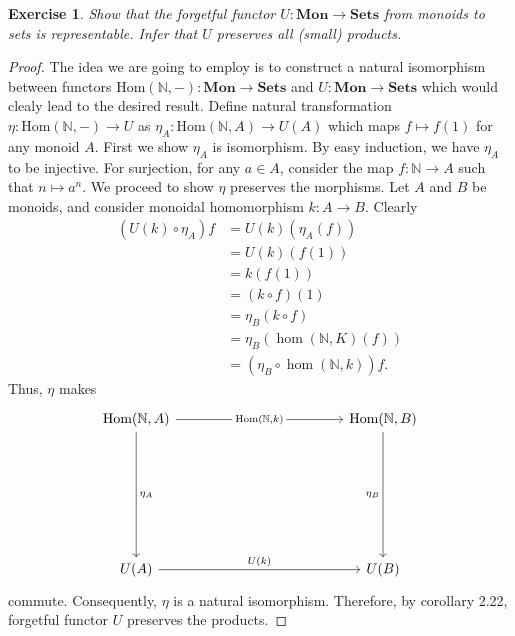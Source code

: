 \documentclass[a4paper, 11pt]{book}
\theoremstyle{plain}
\newtheorem{exercise}{Exercise}[chapter]
\theoremstyle{plain}
\newcommand{\mb}{\mathbf}
\newcommand{\arr}{\rightarrow}
\newcommand{\Hom}{\text{Hom}}
\newcommand{\N}{\mathbb{N}}
\begin{document}
  \begin{exercise}
    Show that the forgetful functor $U:\mb{Mon} \arr \mb{Sets}$ from monoids to sets is representable. Infer that $U$ preserves all (small) products.
  \end{exercise}
  \begin{proof}
    The idea we are going to employ is to construct a natural isomorphism between functors $\Hom(\N, -): \mb{Mon} \arr \mb{Sets}$ and $U: \mb{Mon} \arr \mb{Sets}$ which would clealy lead to the desired result. Define natural transformation $\eta: \Hom(\N, -) \arr U$ as $\eta_A:\Hom(\N, A) \arr U(A)$ which maps $f \mapsto f(1)$ for any monoid $A$. First we show $\eta_A$ is isomorphism. By easy induction, we have $\eta_A$ to be injective. For surjection, for any $a \in A$, consider the map $f:\N \arr A$ such that $n \mapsto a^n$. We proceed to show $\eta$ preserves the morphisms. Let $A$ and $B$ be monoids, and consider monoidal homomorphism $k:A \arr B$. Clearly
    \begin{align*}
      (U(k) \circ \eta_A) f &= U(k) (\eta_A (f)) \\
      &=U(k) (f(1)) \\
      &=k(f(1)) \\
      &=(k \circ f) (1) \\
      &=\eta_B(k \circ f) \\
      &=\eta_B(\hom(\N, K) (f)) \\
      &=(\eta_B \circ \hom(\N,k)) f.
    \end{align*}
    Thus, $\eta$ makes 
    \[\begin{tikzcd}
      {\text{Hom}(\mathbb{N},A)} &&&&& {\text{Hom}(\mathbb{N},B)} \\
      \\
      \\
      \\
      \\
      {U(A)} &&&&& {U(B)}
      \arrow["{\text{Hom}(\mathbb{N}, k)}"{description}, from=1-1, to=1-6]
      \arrow["{\eta_B}"', from=1-6, to=6-6]
      \arrow["{\eta_A}", from=1-1, to=6-1]
      \arrow["{U(k)}", from=6-1, to=6-6]
    \end{tikzcd}\]
    commute. Consequently, $\eta$ is a natural isomorphism. Therefore, by corollary 2.22, forgetful functor $U$ preserves the products.
  \end{proof}
\end{document}
